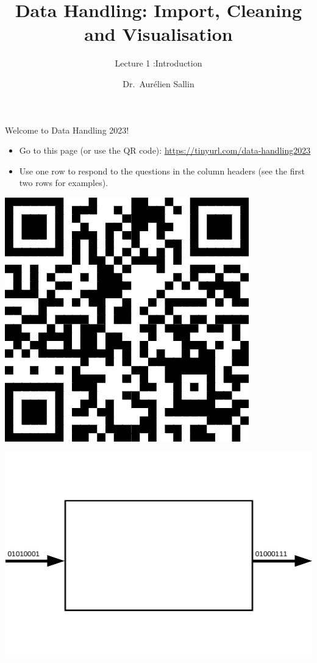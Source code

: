 \documentclass[
  ignorenonframetext,
]{beamer}
\title{Data Handling: Import, Cleaning and Visualisation}
\subtitle{Lecture 1 :Introduction}
\author{Dr.~Aurélien Sallin}
\date{}
\providecommand{\tightlist}{%
  \setlength{\itemsep}{0pt}\setlength{\parskip}{0pt}}
\begin{document}
\frame{\titlepage}

\begin{frame}
\begin{block}{Welcome to Data Handling 2023!}
\protect\hypertarget{welcome-to-data-handling-2023}{}
\begin{itemize}
\tightlist
\item
  Go to this page (or use the QR code):
  \url{https://tinyurl.com/data-handling2023}
\item
  Use one row to respond to the questions in the column headers (see the
  first two rows for examples).
\end{itemize}

\begin{center}\includegraphics[width=0.35\linewidth]{../../img/tinyurl-data-handling2023} \end{center}
\end{block}
\end{frame}

\begin{frame}
\begin{center}\includegraphics[width=0.9\linewidth]{../../img/cpu_blackbox_white} \end{center}
\end{frame}
\end{document}
